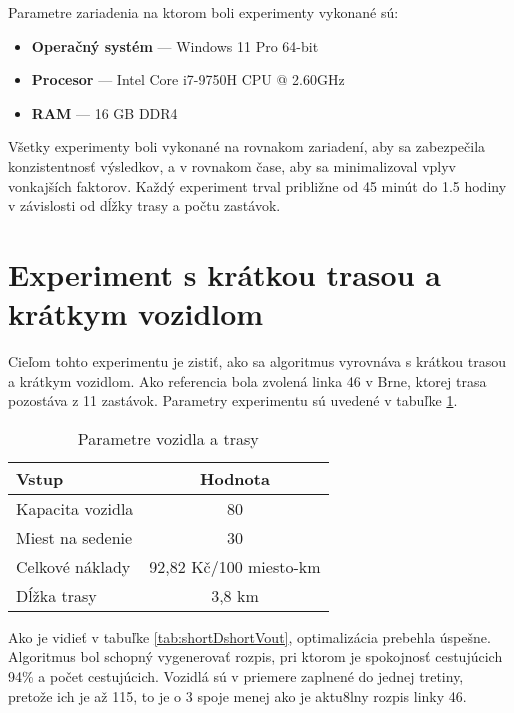 Parametre zariadenia na ktorom boli experimenty vykonané sú:
\begin{itemize}
  \item \textbf{Operačný systém} --- Windows 11 Pro 64-bit
  \item \textbf{Procesor} --- Intel Core i7-9750H CPU @ 2.60GHz
  \item \textbf{RAM} --- 16 GB DDR4
\end{itemize}

Všetky experimenty boli vykonané na rovnakom zariadení, aby sa zabezpečila konzistentnosť výsledkov,
a v rovnakom čase, aby sa minimalizoval vplyv vonkajších faktorov.
Každý experiment trval približne od 45 minút do 1.5 hodiny v závislosti od dĺžky trasy a počtu zastávok.

\newpage
\section{Experiment s krátkou trasou a krátkym vozidlom}
Cieľom tohto experimentu je zistiť, ako sa algoritmus vyrovnáva s krátkou trasou a krátkym vozidlom.
Ako referencia bola zvolená linka 46 v Brne, ktorej trasa pozostáva z 11 zastávok.
Parametry experimentu sú uvedené v tabuľke \ref{tab:shortDshortVin}.

\begin{table}[h]
  \centering
  \begin{tabular}{|l|c|}
    \hline
    \textbf{Vstup} & \textbf{Hodnota} \\ \hline
    Kapacita vozidla & 80 \\ \hline
    Miest na sedenie & 30 \\ \hline
    Celkové náklady & 92,82 Kč/100 miesto-km \\ \hline
    Dĺžka trasy & 3,8 km \\ \hline
  \end{tabular}
  \caption{Parametre vozidla a trasy}
  \label{tab:shortDshortVin}
\end{table}

Ako je vidieť v tabuľke \ref{tab:shortDshortVout}, optimalizácia prebehla úspešne.
Algoritmus bol schopný vygenerovať rozpis, pri ktorom je spokojnosť cestujúcich 94\% a počet cestujúcich.
Vozidlá sú v priemere zaplnené do jednej tretiny, pretože ich je až 115, to je o 3 spoje menej ako je aktu8lny rozpis linky 46.

